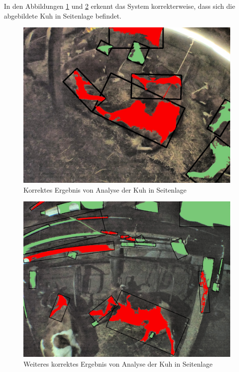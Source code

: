 In den Abbildungen \ref{fig: Korrektes Ergebnis von Analyse der Kuh in Seitenlage} und \ref{fig: Weiteres korrektes Ergebnis von Analyse der Kuh in Seitenlage} erkennt das System korrekterweise, dass sich die abgebildete Kuh in Seitenlage befindet. 

\begin{figure}[H]
	\center
	\includegraphics[scale=0.1]{Grafiken/resultate/resultatLying1.jpg}
	\caption{Korrektes Ergebnis von Analyse der Kuh in Seitenlage} 
	\label{fig: Korrektes Ergebnis von Analyse der Kuh in Seitenlage} 
\end{figure}


\begin{figure}[H]
	\center
	\includegraphics[scale=0.1]{Grafiken/resultate/resultatLying2.jpg}
	\caption{Weiteres korrektes Ergebnis von Analyse der Kuh in Seitenlage} 
	\label{fig: Weiteres korrektes Ergebnis von Analyse der Kuh in Seitenlage} 
\end{figure}

